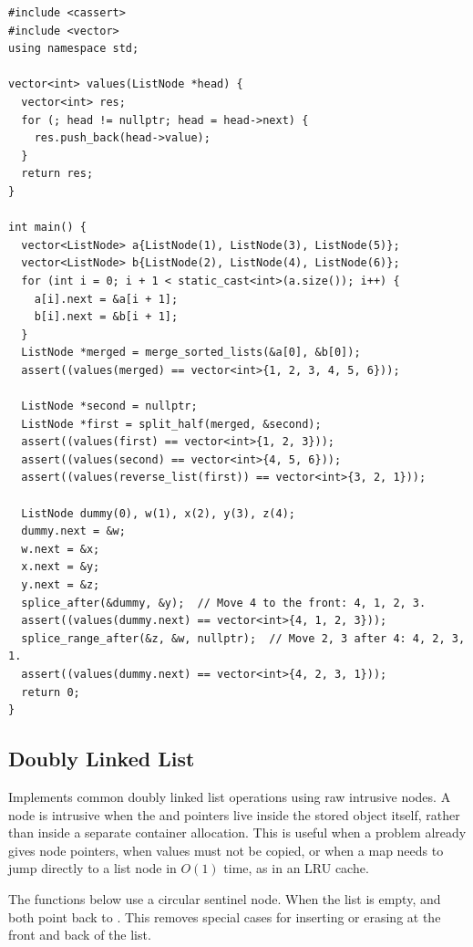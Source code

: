 \begin{lstlisting}[style=cpp]
#include <cassert>
#include <vector>
using namespace std;

vector<int> values(ListNode *head) {
  vector<int> res;
  for (; head != nullptr; head = head->next) {
    res.push_back(head->value);
  }
  return res;
}

int main() {
  vector<ListNode> a{ListNode(1), ListNode(3), ListNode(5)};
  vector<ListNode> b{ListNode(2), ListNode(4), ListNode(6)};
  for (int i = 0; i + 1 < static_cast<int>(a.size()); i++) {
    a[i].next = &a[i + 1];
    b[i].next = &b[i + 1];
  }
  ListNode *merged = merge_sorted_lists(&a[0], &b[0]);
  assert((values(merged) == vector<int>{1, 2, 3, 4, 5, 6}));

  ListNode *second = nullptr;
  ListNode *first = split_half(merged, &second);
  assert((values(first) == vector<int>{1, 2, 3}));
  assert((values(second) == vector<int>{4, 5, 6}));
  assert((values(reverse_list(first)) == vector<int>{3, 2, 1}));

  ListNode dummy(0), w(1), x(2), y(3), z(4);
  dummy.next = &w;
  w.next = &x;
  x.next = &y;
  y.next = &z;
  splice_after(&dummy, &y);  // Move 4 to the front: 4, 1, 2, 3.
  assert((values(dummy.next) == vector<int>{4, 1, 2, 3}));
  splice_range_after(&z, &w, nullptr);  // Move 2, 3 after 4: 4, 2, 3, 1.
  assert((values(dummy.next) == vector<int>{4, 2, 3, 1}));
  return 0;
}
\end{lstlisting}
\subsection{Doubly Linked List}
\label{sec:2.1.2}
Implements common doubly linked list operations using raw intrusive nodes. A node is intrusive when the  and  pointers live inside the stored object itself, rather than inside a separate container allocation. This is useful when a problem already gives node pointers, when values must not be copied, or when a map needs to jump directly to a list node in $O(1)$ time, as in an LRU cache.

The functions below use a circular sentinel node. When the list is empty,  and  both point back to . This removes special cases for inserting or erasing at the front and back of the list.

